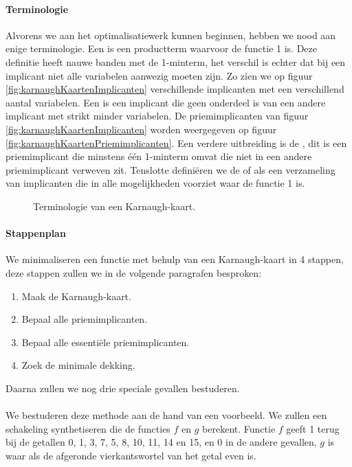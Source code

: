 \paragraph{Terminologie} Alvorens we aan het optimalisatiewerk kunnen beginnen, hebben we nood aan enige terminologie. Een  is een productterm waarvoor de functie 1 is. Deze definitie heeft nauwe banden met de 1-minterm, het verschil is echter dat bij een implicant niet alle variabelen aanwezig moeten zijn. Zo zien we op figuur \ref{fig:karnaughKaartenImplicanten} verschillende implicanten met een verschillend aantal variabelen. Een  is een implicant die geen onderdeel is van een andere implicant met strikt minder variabelen. De priemimplicanten van figuur \ref{fig:karnaughKaartenImplicanten} worden weergegeven op figuur \ref{fig:karnaughKaartenPriemimplicanten}. Een verdere uitbreiding is de , dit is een priemimplicant die minstens \'e\'en 1-minterm omvat die niet in een andere priemimplicant verweven zit. Tenslotte defini\"eren we de  of  als een verzameling van implicanten die in alle mogelijkheden voorziet waar de functie 1 is.
\begin{figure}[hbt]
\centering
{}
\caption{Terminologie van een Karnaugh-kaart.}
\end{figure}
\paragraph{Stappenplan}
We minimaliseren een functie met behulp van een Karnaugh-kaart in 4 stappen, deze stappen zullen we in de volgende paragrafen besproken:
\begin{enumerate}
 \item Maak de Karnaugh-kaart.
 \item Bepaal alle priemimplicanten.
 \item Bepaal alle essenti\"ele priemimplicanten.
 \item Zoek de minimale dekking.
\end{enumerate}
Daarna zullen we nog drie speciale gevallen bestuderen.
\paragraph{}
We bestuderen deze methode aan de hand van een voorbeeld. We zullen een schakeling synthetiseren die de functies $f$ en $g$ berekent. Functie $f$ geeft 1 terug bij de getallen 0, 1, 3, 7, 5, 8, 10, 11, 14 en 15, en 0 in de andere gevallen, $g$ is waar  als de afgeronde vierkantswortel van het getal even is.
